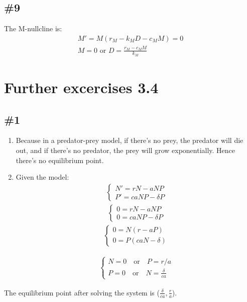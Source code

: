 \documentclass[12pt]{article}
\begin{document}
\subsection*{\#9}
The M-nullcline is:
\begin{align*}
    M' = M(r_M - k_M D - c_M M) = 0 \\
    M = 0 \text{ or } D = \frac{r_M - c_M M}{k_M}
\end{align*}

\section*{Further excercises 3.4}
\subsection*{\#1}
\begin{enumerate}[label=\alph*.] 
  \item Because in a predator-prey model, if there's no prey, the predator will die out, and if there's no predator, the prey will grow exponentially. Hence there's no equilibrium point.
  \item Given the model:
\begin{align*}
    \begin{cases}
    N' = rN - aNP \\
    P' = caNP - \delta P
    \end{cases}
\end{align*}
\begin{align*}
    \begin{cases}
    0 = rN - aNP \\
    0 = caNP - \delta P
    \end{cases}
\end{align*}
\begin{align*}
    \begin{cases}
    0 = N(r - aP) \\
    0 = P(caN - \delta)
    \end{cases}
\end{align*}

\begin{align*}
    \begin{cases}
    N = 0 \quad \text{or} \quad P = r / a \\
    P = 0 \quad \text{or} \quad N = \frac{\delta}{ca}
    \end{cases}
\end{align*}
\end{enumerate}
The equilibrium point after solving the system is ($\frac{\delta}{ca}, \frac{r}{a}$).
\end{document}
